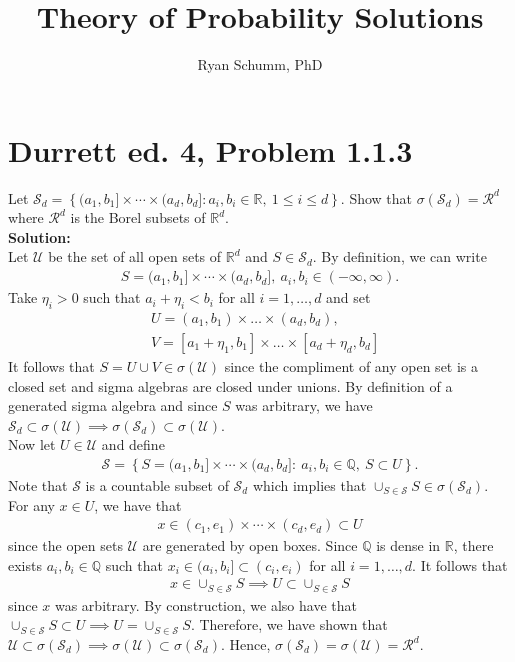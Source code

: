 \documentclass[12pt]{article}
\title{Theory of Probability Solutions}
\author{Ryan Schumm, PhD}
\date{}
\newcommand{\Sd}{\mathcal{S}_d}
\newcommand{\U}{\mathcal{U}}
\begin{document}
    \maketitle
    \setlength{\parindent}{0pt}

    \section*{Durrett ed. 4, Problem 1.1.3}
    Let $\mathcal{S}_d = \left\{(a_1, b_1]\times\cdots\times(a_d, b_d]: a_i, b_i\in\mathbb R, \ 1 \leq i \leq d\right\}$. Show that 
    $\sigma\left(\mathcal S_d\right) = \mathcal R^d$ where $\mathcal R^d$ is the Borel subsets of $\mathbb R^d$.\\

    \textbf{Solution:}\\
    Let $\U$ be the set of all open sets of $\mathbb R^d$ and $S\in\Sd$. By definition, we can write
    \begin{align*}
        S = (a_1, b_1]\times\cdots\times(a_d, b_d], \ a_i, b_i\in(-\infty, \infty).
    \end{align*}
    Take $\eta_i > 0$ such that $a_i + \eta_i < b_i$ for all $i = 1,\ldots,d$ and set 
    \begin{align}
        &U = (a_1, b_1)\times\ldots\times(a_d, b_d),\\
        &V = [a_1 + \eta_1, b_1]\times\ldots\times[a_d + \eta_d, b_d]
    \end{align}
    It follows that $S = U \cup V\in\sigma(\U)$ since the compliment of any open set is a closed set and sigma algebras are closed under unions. By definition 
    of a generated sigma algebra and since $S$ was arbitrary, we have $\Sd\subset\sigma(\U)\implies\sigma(\Sd)\subset\sigma(\U)$.\\

    Now let $U\in\U$ and define
    \begin{align}
        \label{rat-recs}
        \mathscr S = \left\{S = (a_1, b_1]\times\cdots\times(a_d, b_d]: \ a_i, b_i\in\mathbb Q, \ S\subset U \right\}.
    \end{align}
    Note that $\mathscr S$ is a countable subset of $\Sd$ which implies that $\cup_{S\in \mathscr S}S\in \sigma(\Sd)$. For any $x \in U$, we have that 
    \begin{align}
        x\in(c_1, e_1)\times\cdots\times(c_d, e_d)\subset U
    \end{align}
    since the open sets $\U$ are generated by open boxes. Since $\mathbb Q$ is dense in $\mathbb R$, there exists $a_i, b_i\in\mathbb Q$ such that 
    $x_i\in(a_i, b_i]\subset (c_i, e_i)$ for all $i=1,\ldots,d$. It follows that 
    \begin{align}
        x\in\cup_{S\in \mathscr S}S\implies U\subset\cup_{S\in \mathscr S}S
    \end{align}
    since $x$ was
    arbitrary. By construction, we also have that $\cup_{S\in \mathscr S}S\subset U \implies U = \cup_{S\in \mathscr S}S$. Therefore, we have shown that
    $\U\subset \sigma(\Sd)\implies \sigma(\U)\subset \sigma(\Sd)$. Hence, $\sigma(\Sd) = \sigma(\U) = \mathcal R^d$.
    
\end{document}
